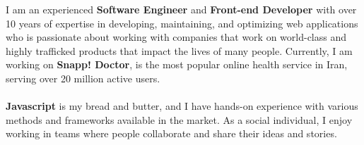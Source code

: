 \documentclass[8pt]{developercv} %
\begin{document}
    \begin{minipage}[t]{0.5\textwidth}
        \vspace{-6pt}

        I am an experienced \textbf{Software Engineer} and \textbf{Front-end Developer} with over 10 years of expertise in developing, maintaining, and optimizing web applications who is passionate about working with companies that work on world-class and highly trafficked products that impact the lives of many people. Currently, I am working on \textbf{Snapp! Doctor}, is the most popular online health service in Iran, serving over 20 million active users.
        \\
        \\
        \textbf{Javascript} is my bread and butter, and I have hands-on experience with various methods and frameworks available in the market. As a social individual, I enjoy working in teams where people collaborate and share their ideas and stories.

    \end{minipage}
    \hfill %
\end{document}
